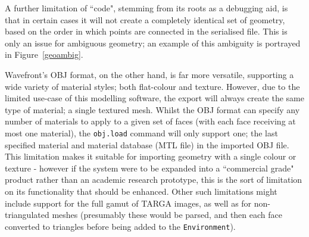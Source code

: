 \documentclass[a4paper,10pt]{article}
\begin{document}
\begin{itemize}
{A further limitation of ``code", stemming from its roots as a debugging aid, is that in certain cases it will not create a completely identical set of geometry, based on the order in which points are connected in the serialised file. This is only an issue for ambiguous geometry; an example of this ambiguity is portrayed in Figure~\ref{geoambig}.

Wavefront's OBJ format, on the other hand, is far more versatile, supporting a wide variety of material styles; both flat-colour and texture. However, due to the limited use-case of this modelling software, the export will always create the same type of material; a single textured mesh. Whilst the OBJ format can specify any number of materials to apply to a given set of faces (with each face receiving at most one material), the \texttt{obj.load} command will only support one; the last specified material and material database (MTL file) in the imported OBJ file. This limitation makes it suitable for importing geometry with a single colour or texture - however if the system were to be expanded into a ``commercial grade" product rather than an academic research prototype, this is the sort of limitation on its functionality that should be enhanced. Other such limitations might include support for the full gamut of TARGA images, as well as for non-triangulated meshes (presumably these would be parsed, and then each face converted to triangles before being added to the \texttt{Environment}).
 }
\end{itemize}
\end{document}
